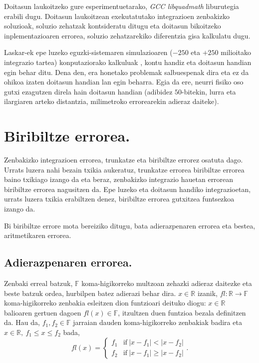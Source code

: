 Doitasun laukoitzeko gure esperimentuetarako, \emph{GCC libquadmath} liburutegia \cite{libquad} erabili dugu. Doitasun laukoitzean exekutatutako integrazioen zenbakizko soluzioak, soluzio zehatzak kontsideratu ditugu eta  doitasun bikoitzeko inplementazioaren errorea, soluzio zehatzarekiko diferentzia gisa kalkulatu dugu. 

Laskar-ek epe luzeko eguzki-sistemaren simulazioaren ($-250$ eta $+250$ milioitako integrazio tartea) konputaziorako kalkuluak \cite{Laskar2011}, kontu handiz eta doitasun handian egin behar ditu. Dena den, era honetako problemak salbuespenak dira eta ez da ohikoa izaten doitasun handian lan egin beharra. Egia da ere, neurri fisiko oso gutxi ezagutzen direla  hain doitasun handian (adibidez $50$-bitekin, lurra eta ilargiaren arteko distantzia, milimetroko errorearekin adieraz daiteke).  


\section{Biribiltze errorea.}

Zenbakizko integrazioen errorea, trunkatze eta biribiltze errorez osatuta dago. Urrats luzera nahi bezain txikia aukeratuz, trunkatze errorea biribiltze errorea baino txikiago izango da eta beraz, zenbakizko integrazio hauetan errorean biribiltze errorea nagusitzen da. Epe luzeko eta doitasun handiko integrazioetan, urrats luzera txikia erabiltzen denez, biribiltze errorea gutxitzea funtsezkoa izango da.     

Bi biribiltze errore mota bereiziko ditugu, bata adierazpenaren errorea eta bestea, aritmetikaren errorea.  

\subsection*{Adierazpenaren errorea.} 

Zenbaki erreal batzuk, $\mathbb{F}$ koma-higikorreko multzoan zehazki adieraz daitezke eta beste batzuk ordea, hurbilpen batez adierazi behar dira. $x \in \mathbb{R}$ izanik, $fl: \mathbb{R} \rightarrow \mathbb{F}$ koma-higikorreko zenbakia esleitzen dion funtzioari deituko diogu:  $x \in \mathbb{R}$ balioaren gertuen dagoen  $fl(x) \in \mathbb{F}$, itzultzen duen funtzioa bezala definitzen da. Hau da, $f_1,f_2 \in \mathbb{F}$ jarraian dauden koma-higikorreko zenbakiak  badira eta $x \in \mathbb{R}, \ f_1\leqslant x \leqslant f_2$ bada,
\begin{equation*}
fl(x)=
\left\{
        \begin{array}{lc}
        f_1 & \mathrm{if} \ |x-f_1| < |x-f_2| \\
        f_2 & \mathrm{if} \ |x-f_1| \geqslant |x-f_2| 
        \end{array}.
\right.
\end{equation*}  

